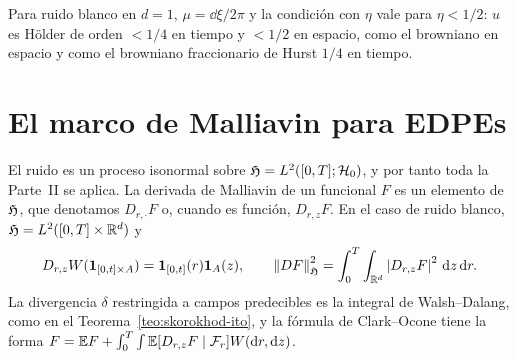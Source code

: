 \begin{ejemplo}
Para ruido blanco en $d=1$, $\mu=\dd\xi/2\pi$ y la condición con $\eta$ vale para $\eta<1/2$:
$u$ es Hölder de orden $<1/4$ en tiempo y $<1/2$ en espacio, como el browniano en espacio y
como el browniano fraccionario de Hurst $1/4$ en tiempo.
\end{ejemplo}

\section{El marco de Malliavin para EDPEs}
El ruido es un proceso isonormal sobre $\mathfrak{H}=L^2([0,T];\mathcal{H}_0)$, y por tanto toda la Parte~II se
aplica. La derivada de Malliavin de un funcional $F$ es un elemento de $\mathfrak{H}$, que denotamos $D_{r,\cdot}F$
o, cuando es función, $D_{r,z}F$. En el caso de ruido blanco, $\mathfrak{H}=L^2([0,T]\times\mathbb{R}^d)$ y
\[
  D_{r,z}W(\mathbf{1}_{[0,t]\times A})=\mathbf{1}_{[0,t]}(r)\mathbf{1}_A(z),\qquad\left\lVert DF\right\rVert^2_{\mathfrak{H}}=\int_0^T\int_{\mathbb{R}^d}\left\lvert D_{r,z}F\right\rvert^2\,\mathrm{d} z\,\mathrm{d} r.
\]
La divergencia $\delta$ restringida a campos predecibles es la integral de Walsh--Dalang, como en el
Teorema~\ref{teo:skorokhod-ito}, y la fórmula de Clark--Ocone tiene la forma $F=\mathbb{E} F+\int_0^T\int\mathbb{E}[D_{r,z}F\mid\mathcal{F}_r]W(\mathrm{d} r,\mathrm{d} z)$.
